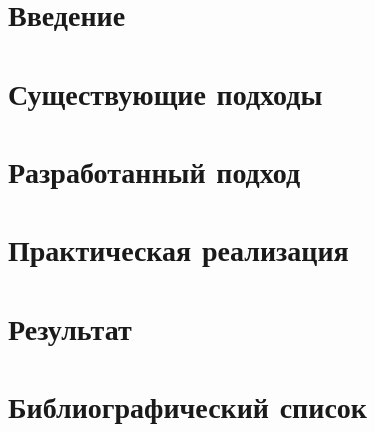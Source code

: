 \documentclass[14pt]{extarticle}
\numberwithin{equation}{section}
\begin{document}
	\tableofcontents
	\clearpage

	\section{Введение}
	
	\FloatBarrier
	\clearpage

	\section{Существующие подходы}
	
	\FloatBarrier
	\clearpage

	\section{Разработанный подход}
	
	\FloatBarrier
	\clearpage

	\section{Практическая реализация}
	
	\FloatBarrier
	\clearpage

	\section{Результат}
	
	\FloatBarrier
	\clearpage

	\section{Библиографический список}
	
	\clearpage
\end{document}
